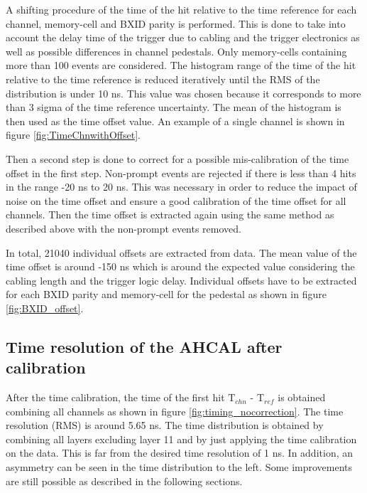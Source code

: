 A shifting procedure of the time of the hit relative to the time reference for each channel, memory-cell and BXID parity is performed. This is done to take into account the delay time of the trigger due to cabling and the trigger electronics as well as possible differences in channel pedestals. Only memory-cells containing more than 100 events are considered. The histogram range of the time of the hit relative to the time reference is reduced iteratively until the RMS of the distribution is under 10 ns. This value was chosen because it corresponds to more than 3 sigma of the time reference uncertainty. The mean of the histogram is then used as the time offset value. An example of a single channel is shown in figure \ref{fig:TimeChnwithOffset}.

Then a second step is done to correct for a possible mis-calibration of the time offset in the first step. Non-prompt events are rejected if there is less than 4 hits in the range -20 ns to 20 ns. This was necessary in order to reduce the impact of noise on the time offset and ensure a good calibration of the time offset for all channels. Then the time offset is extracted again using the same method as described above with the non-prompt events removed.

In total, 21040 individual offsets are extracted from data. The mean value of the time offset is around -150 ns which is around the expected value considering the cabling length and the trigger logic delay. Individual offsets have to be extracted for each BXID parity and memory-cell for the pedestal as shown in figure \ref{fig:BXID_offset}.

\subsection{Time resolution of the AHCAL after calibration}

After the time calibration, the time of the first hit T$_{chn}$ - T$_{ref}$ is obtained combining all channels as shown in figure \ref{fig:timing_nocorrection}. The time resolution (RMS) is around 5.65 ns. The time distribution is obtained by combining all layers excluding layer 11 and by just applying the time calibration on the data. This is far from the desired time resolution of 1 ns. In addition, an asymmetry can be seen in the time distribution to the left. Some improvements are still possible as described in the following sections.

